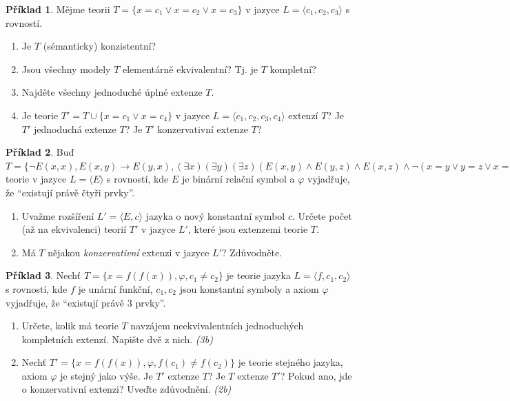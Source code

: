 \documentclass[a4paper]{article}
\theoremstyle{definition}
\newtheorem{problem}{Příklad}
\begin{document}
\medskip\begin{problem}
    Mějme teorii $T=\{x=c_1 \vee x=c_2 \vee x=c_3\}$ v jazyce $L=\langle c_1,c_2,c_3\rangle$ s rovností.
    \begin{enumerate}        
        \item Je $T$ (sémanticky) konzistentní?
        \item Jsou všechny modely $T$ elementárně ekvivalentní? Tj. je $T$ kompletní?
        \item Najděte všechny jednoduché úplné extenze $T$.
        \item Je teorie $T'=T\cup\{x=c_1 \vee x=c_4\}$ v jazyce $L=\langle c_1,c_2,c_3,c_4\rangle$ extenzí $T$? Je $T'$ jednoduchá extenze $T$? Je $T'$ konzervativní extenze $T$?
    \end{enumerate}
\end{problem}


\medskip\begin{problem}
Buď $T=\{\neg E(x,x), E(x,y)\to E(y,x), (\exists x)(\exists y)(\exists z)(E(x,y)\wedge E(y,z)\wedge E(x,z)\wedge \neg(x=y\vee y=z\vee x=z)),\varphi\}$ teorie v jazyce $L=\langle E\rangle$ s rovností, kde $E$ je binární relační symbol a $\varphi$ vyjadřuje, že ``existují právě čtyři prvky''.
\begin{enumerate}    
    \item Uvažme rozšíření $L'=\langle E,c\rangle$ jazyka o nový konstantní symbol $c$. Určete počet (až na ekvivalenci) teorií $T'$ v jazyce $L'$, které jsou extenzemi teorie $T$. 
    \item Má $T$ nějakou \emph{konzervativní} extenzi v jazyce $L'$? Zdůvodněte.
\end{enumerate}
\end{problem}


\medskip\begin{problem}
Nechť $T=\{x=f(f(x)),\varphi, c_1 \ne c_2\}$ je teorie jazyka $L=\langle f,c_1,c_2\rangle$ s rovností, kde $f$ je unární funkční, $c_1,c_2$ jsou konstantní symboly a axiom $\varphi$ vyjadřuje, že ``existují právě $3$ prvky''.
\begin{enumerate}    
    \item Určete, kolik má teorie $T$ navzájem neekvivalentních jednoduchých kompletních extenzí. Napište dvě z nich. {\it (3b)}
    \item Nechť $T'=\{x=f(f(x)),\varphi,f(c_1)\ne f(c_2)\}$ je teorie stejného jazyka, axiom $\varphi$ je stejný jako výše. Je $T'$ extenze $T$? Je $T$ extenze $T'$? Pokud ano, jde o konzervativní extenzi? Uveďte zdůvodnění. {\it (2b)}
\end{enumerate}
\end{problem}
\end{document}
